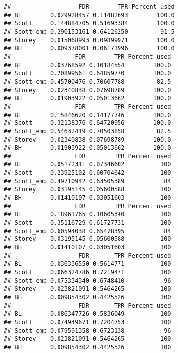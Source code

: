 \documentclass{article}\usepackage[]{graphicx}\usepackage[]{color}
\makeatletter
\newenvironment{kframe}{%
 \def\at@end@of@kframe{}%
 \ifinner\ifhmode%
  \def\at@end@of@kframe{\end{minipage}}%
  \begin{minipage}{\columnwidth}%
 \fi\fi%
 \def\FrameCommand##1{\hskip\@totalleftmargin \hskip-\fboxsep
 \colorbox{shadecolor}{##1}\hskip-\fboxsep
     \hskip-\linewidth \hskip-\@totalleftmargin \hskip\columnwidth}%
 \MakeFramed {\advance\hsize-\width
   \@totalleftmargin\z@ \linewidth\hsize
   \@setminipage}}%
 {\par\unskip\endMakeFramed%
 \at@end@of@kframe}
\newenvironment{knitrout}{}{} %
\makeatother
\begin{document}
\begin{knitrout}
\begin{kframe}
\begin{verbatim}
##                   FDR        TPR Percent used
## BL        0.029928457 0.11482693        100.0
## Scott     0.144884705 0.51693384        100.0
## Scott_emp 0.290153161 0.64126250         91.5
## Storey    0.015068993 0.09899971        100.0
## BH        0.009378001 0.06171996        100.0
##                  FDR        TPR Percent used
## BL        0.03768592 0.10184554        100.0
## Scott     0.20899561 0.64859770        100.0
## Scott_emp 0.45700476 0.70607788         82.5
## Storey    0.02340838 0.07698789        100.0
## BH        0.01903922 0.05013662        100.0
##                  FDR        TPR Percent used
## BL        0.15846620 0.14177746        100.0
## Scott     0.32138376 0.64720956        100.0
## Scott_emp 0.54632419 0.70503858         82.5
## Storey    0.02340838 0.07698789        100.0
## BH        0.01903922 0.05013662        100.0
##                  FDR        TPR Percent used
## BL        0.05172311 0.07346602          100
## Scott     0.23925102 0.60704642          100
## Scott_emp 0.49710942 0.63505389           84
## Storey    0.03195145 0.05600588          100
## BH        0.01410107 0.03051603          100
##                  FDR        TPR Percent used
## BL        0.18961765 0.10605340          100
## Scott     0.35116729 0.61727731          100
## Scott_emp 0.60594038 0.65478395           84
## Storey    0.03195145 0.05600588          100
## BH        0.01410107 0.03051603          100
##                   FDR       TPR Percent used
## BL        0.036336550 0.5614771          100
## Scott     0.066324786 0.7219471          100
## Scott_emp 0.075334340 0.6748410           96
## Storey    0.023821091 0.5464265          100
## BH        0.009854302 0.4425526          100
##                   FDR       TPR Percent used
## BL        0.086347726 0.5836049          100
## Scott     0.074949671 0.7204753          100
## Scott_emp 0.079591358 0.6723138           96
## Storey    0.023821091 0.5464265          100
## BH        0.009854302 0.4425526          100
\end{verbatim}
\end{kframe}
\end{knitrout}
\end{document}
